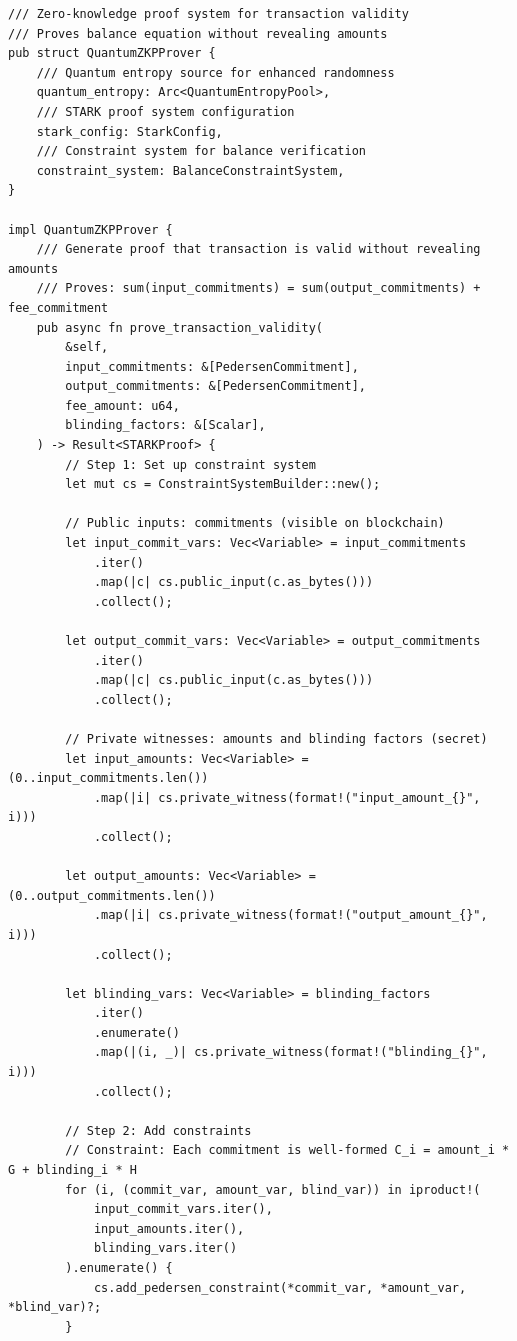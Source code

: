 \documentclass[11pt,a4paper]{article}
\begin{document}
\begin{lstlisting}[caption=ZK-STARK Balance Proof Generation]
/// Zero-knowledge proof system for transaction validity
/// Proves balance equation without revealing amounts
pub struct QuantumZKPProver {
    /// Quantum entropy source for enhanced randomness
    quantum_entropy: Arc<QuantumEntropyPool>,
    /// STARK proof system configuration
    stark_config: StarkConfig,
    /// Constraint system for balance verification
    constraint_system: BalanceConstraintSystem,
}

impl QuantumZKPProver {
    /// Generate proof that transaction is valid without revealing amounts
    /// Proves: sum(input_commitments) = sum(output_commitments) + fee_commitment
    pub async fn prove_transaction_validity(
        &self,
        input_commitments: &[PedersenCommitment],
        output_commitments: &[PedersenCommitment],
        fee_amount: u64,
        blinding_factors: &[Scalar],
    ) -> Result<STARKProof> {
        // Step 1: Set up constraint system
        let mut cs = ConstraintSystemBuilder::new();
        
        // Public inputs: commitments (visible on blockchain)
        let input_commit_vars: Vec<Variable> = input_commitments
            .iter()
            .map(|c| cs.public_input(c.as_bytes()))
            .collect();
            
        let output_commit_vars: Vec<Variable> = output_commitments
            .iter()
            .map(|c| cs.public_input(c.as_bytes()))
            .collect();
        
        // Private witnesses: amounts and blinding factors (secret)
        let input_amounts: Vec<Variable> = (0..input_commitments.len())
            .map(|i| cs.private_witness(format!("input_amount_{}", i)))
            .collect();
            
        let output_amounts: Vec<Variable> = (0..output_commitments.len())
            .map(|i| cs.private_witness(format!("output_amount_{}", i)))
            .collect();
        
        let blinding_vars: Vec<Variable> = blinding_factors
            .iter()
            .enumerate()
            .map(|(i, _)| cs.private_witness(format!("blinding_{}", i)))
            .collect();
        
        // Step 2: Add constraints
        // Constraint: Each commitment is well-formed C_i = amount_i * G + blinding_i * H
        for (i, (commit_var, amount_var, blind_var)) in iproduct!(
            input_commit_vars.iter(),
            input_amounts.iter(),
            blinding_vars.iter()
        ).enumerate() {
            cs.add_pedersen_constraint(*commit_var, *amount_var, *blind_var)?;
        }
        

\end{lstlisting}
\end{document}
